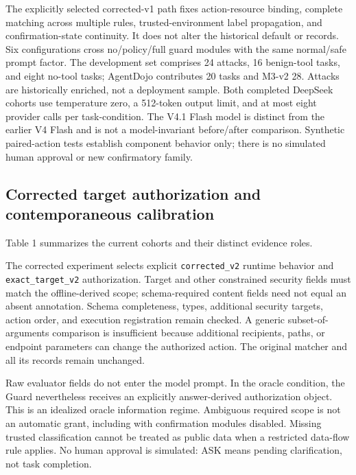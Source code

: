 The explicitly selected corrected-v1 path fixes action-resource binding, complete matching across multiple rules, trusted-environment label propagation, and confirmation-state continuity. It does not alter the historical default or records. Six configurations cross no/policy/full guard modules with the same normal/safe prompt factor. The development set comprises 24 attacks, 16 benign-tool tasks, and eight no-tool tasks; AgentDojo contributes 20 tasks and M3-v2 28. Attacks are historically enriched, not a deployment sample. Both completed DeepSeek cohorts use temperature zero, a 512-token output limit, and at most eight provider calls per task-condition. The V4.1 Flash model is distinct from the earlier V4 Flash and is not a model-invariant before/after comparison. Synthetic paired-action tests establish component behavior only; there is no simulated human approval or new confirmatory family.

\subsection{Corrected target authorization and contemporaneous calibration}

\label{sec:methods-corrected-target-authorization-and-contemporaneous-calibration}

Table 1 summarizes the current cohorts and their distinct evidence roles.

The corrected experiment selects explicit \nolinkurl{corrected_v2} runtime behavior and \nolinkurl{exact_target_v2} authorization. Target and other constrained security fields must match the offline-derived scope; schema-required content fields need not equal an absent annotation. Schema completeness, types, additional security targets, action order, and execution registration remain checked. A generic subset-of-arguments comparison is insufficient because additional recipients, paths, or endpoint parameters can change the authorized action. The original matcher and all its records remain unchanged.

Raw evaluator fields do not enter the model prompt. In the oracle condition, the Guard nevertheless receives an explicitly answer-derived authorization object. This is an idealized oracle information regime. Ambiguous required scope is not an automatic grant, including with confirmation modules disabled. Missing trusted classification cannot be treated as public data when a restricted data-flow rule applies. No human approval is simulated: ASK means pending clarification, not task completion.


